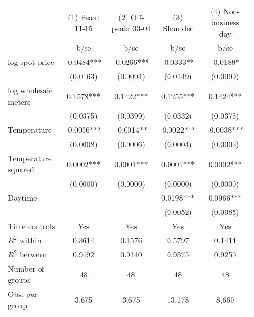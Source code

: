 \begin{tabular}{lcccc}\toprule
                    &(1) Peak: 11-15   &(2) Off-peak: 00-04   &(3) Shoulder   &(4) Non-business day   \\
                    &        b/se   &        b/se   &        b/se   &        b/se   \\
\midrule
log spot price      &     -0.0484***&     -0.0266***&     -0.0333** &     -0.0189*  \\
                    &    (0.0163)   &    (0.0094)   &    (0.0149)   &    (0.0099)   \\
log wholesale meters&      0.1578***&      0.1422***&      0.1255***&      0.1424***\\
                    &    (0.0375)   &    (0.0399)   &    (0.0332)   &    (0.0375)   \\
Temperature         &     -0.0036***&     -0.0014** &     -0.0022***&     -0.0038***\\
                    &    (0.0008)   &    (0.0006)   &    (0.0004)   &    (0.0006)   \\
Temperature squared &      0.0002***&      0.0001***&      0.0001***&      0.0002***\\
                    &    (0.0000)   &    (0.0000)   &    (0.0000)   &    (0.0000)   \\
Daytime             &               &               &      0.0198***&      0.0966***\\
                    &               &               &    (0.0052)   &    (0.0085)   \\
Time controls      &         Yes   &         Yes   &         Yes   &         Yes   \\
\midrule
\(R^2\) within      &      0.3614   &      0.1576   &      0.5797   &      0.1414   \\
\(R^2\) between     &      0.9492   &      0.9140   &      0.9375   &      0.9250   \\
Number of groups    &          48   &          48   &          48   &          48   \\
Obs. per group      &       3,675   &       3,675   &      13,178   &       8,660   \\
\bottomrule\end{tabular}

